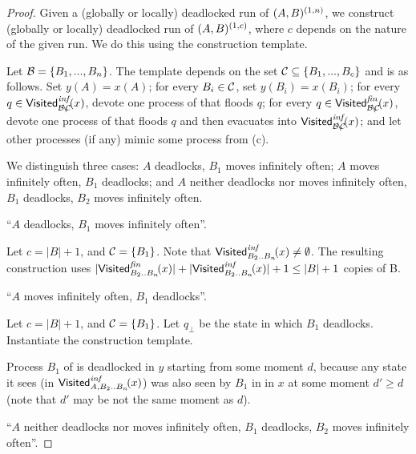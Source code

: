 \begin{proof}
Given a (globally or locally) deadlocked run of $(A,B)^{(1,n)}$,
we construct (globally or locally) deadlocked run of $(A,B)^{(1,c)}$, 
where $c$ depends on the nature of the given run. 
We do this using the construction template. 

Let $\mathcal{B}=\{B_1,...,B_n\}$.
The template depends on the set $\mathcal{C} \subseteq \{B_1,...,B_c\}$
and is as follows.
\li
  \-[a.] Set $y(A)=x(A)$;
  \-[b.] for every $B_i \in \mathcal{C}$, set $y(B_i)=x(B_i)$;
  \-[c.] for every $q \in \mathsf{Visited}^{\textit{inf}}_{\mathcal{B}\!\setminus\!\mathcal{C}}\!(x)$, 
         devote one process of \cutoffsys that floods $q$;
  \-[d.] for every $q \in \mathsf{Visited}^{\textit{fin}}_{\mathcal{B}\!\setminus\!\mathcal{C}}\!(x)$, 
         devote one process of \cutoffsys that floods $q$ 
         and then evacuates into $\mathsf{Visited}^{\textit{inf}}_{\mathcal{B}\!\setminus\!\mathcal{C}}\!(x)$;
         and
  \-[e.] let other processes (if any) mimic some process from (c).
\il

We distinguish three cases: 
\li
  \-[1a)] $A$ deadlocks, $B_1$ moves infinitely often;
  \-[1b)] $A$ moves infinitely often, $B_1$ deadlocks; and
  \-[1c)] $A$ neither deadlocks nor moves infinitely often, 
          $B_1$ deadlocks, $B_2$ moves infinitely often.
\il

 ``$A$ deadlocks, $B_1$ moves infinitely often''. 

Let $c=|B|+1$, and $\mathcal{C}=\{B_1\}$.
Note that $\mathsf{Visited}^{\textit{inf}}_{B_2..B_n}\!(x) \neq \emptyset$. 
The resulting construction uses 
$|\mathsf{Visited}^{\textit{fin}}_{B_2..B_n}\!(x)| + |\mathsf{Visited}^{\textit{inf}}_{B_2..B_n}\!(x)| + 1 
 \leq 
 |B| + 1$ 
copies of B.

 ``$A$ moves infinitely often, $B_1$ deadlocks''. 

Let $c=|B|+1$, and $\mathcal{C}=\{B_1\}$.
Let $q_\bot$ be the state in which $B_1$ deadlocks.
Instantiate the construction template.

Process $B_1$ of \cutoffsys is deadlocked in $y$ starting from some moment $d$,
because any state it sees (in $\mathsf{Visited}^{\textit{inf}}_{A,B_2..B_n}\!(x)$)
was also seen by $B_1$ in \largesys in $x$ at some moment $d' \geq d$
(note that $d'$ may be not the same moment as $d$).


 ``$A$ neither deadlocks nor moves infinitely often, 
                       $B_1$ deadlocks, $B_2$ moves infinitely often''. 


\end{proof}
